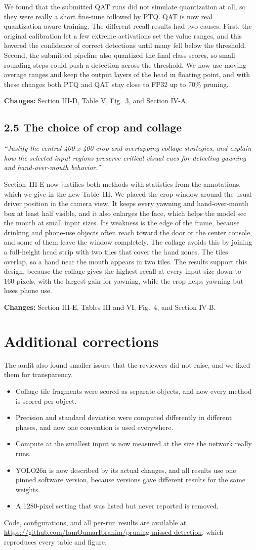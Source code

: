 \documentclass[10pt]{article}
\newcommand{\comment}[2]{\subsection*{#1}\textit{#2}\par}
\newcommand{\changes}[1]{\par\textbf{Changes:} #1}
\begin{document}
We found that the submitted QAT runs did not simulate quantization at all, so they were really a short fine-tune followed by PTQ. QAT is now real quantization-aware training. The different recall results had two causes. First, the original calibration let a few extreme activations set the value ranges, and this lowered the confidence of correct detections until many fell below the threshold. Second, the submitted pipeline also quantized the final class scores, so small rounding steps could push a detection across the threshold. We now use moving-average ranges and keep the output layers of the head in floating point, and with these changes both PTQ and QAT stay close to FP32 up to 70\% pruning.
\changes{Section III-D, Table V, Fig.~3, and Section IV-A.}

\comment{2.5 The choice of crop and collage}{``Justify the central 400 x 400 crop and overlapping-collage strategies, and explain how the selected input regions preserve critical visual cues for detecting yawning and hand-over-mouth behavior.''}
Section~III-E now justifies both methods with statistics from the annotations, which we give in the new Table~III. We placed the crop window around the usual driver position in the camera view. It keeps every yawning and hand-over-mouth box at least half visible, and it also enlarges the face, which helps the model see the mouth at small input sizes. Its weakness is the edge of the frame, because drinking and phone-use objects often reach toward the door or the center console, and some of them leave the window completely. The collage avoids this by joining a full-height head strip with two tiles that cover the hand zones. The tiles overlap, so a hand near the mouth appears in two tiles. The results support this design, because the collage gives the highest recall at every input size down to 160 pixels, with the largest gain for yawning, while the crop helps yawning but loses phone use.
\changes{Section III-E, Tables III and VI, Fig.~4, and Section IV-B.}

\section*{Additional corrections}
The audit also found smaller issues that the reviewers did not raise, and we fixed them for transparency.
\begin{itemize}
\item Collage tile fragments were scored as separate objects, and now every method is scored per object.
\item Precision and standard deviation were computed differently in different phases, and now one convention is used everywhere.
\item Compute at the smallest input is now measured at the size the network really runs.
\item YOLO26n is now described by its actual changes, and all results use one pinned software version, because versions gave different results for the same weights.
\item A 1280-pixel setting that was listed but never reported is removed.
\end{itemize}

Code, configurations, and all per-run results are available at \url{https://github.com/IamOumarIbrahim/pruning-missed-detection}, which reproduces every table and figure.
\end{document}
